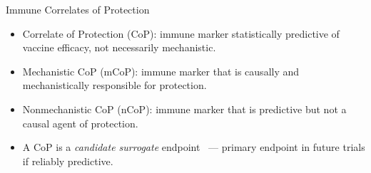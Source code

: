 \documentclass{beamer}
\begin{document}

\begin{frame}[c]{Immune Correlates of
  Protection~\citep{plotkin2012nomenclature}}

\begin{center}
\begin{itemize}
  \itemsep8pt
  \item Correlate of Protection (CoP): immune marker statistically predictive
    of vaccine efficacy, not necessarily mechanistic.
  \item Mechanistic CoP (mCoP): immune marker that is causally and
    mechanistically responsible for protection.
  \item Nonmechanistic CoP (nCoP): immune marker that is predictive but not a
    causal agent of protection.
  \item A CoP is a \textit{candidate surrogate}
      endpoint~\citep{prentice1989surrogate} --- primary
      endpoint in future trials if reliably predictive.
\end{itemize}
\end{center}

\note{
}

\end{frame}

\end{document}
